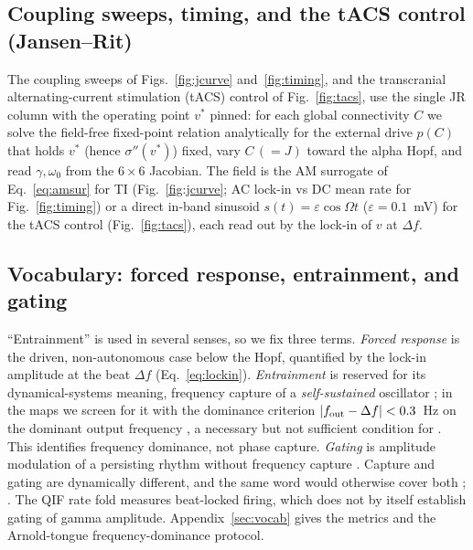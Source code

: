 \documentclass[11pt,a4paper]{article}
\newcommand{\Sig}{\sigma}
\providecommand{\DIFaddtex}[1]{{\protect\color{blue} \sf #1}} %
\providecommand{\DIFdeltex}[1]{{\protect\color{red} \scriptsize #1}} %
\providecommand{\DIFaddbegin}{} %
\providecommand{\DIFaddend}{} %
\providecommand{\DIFdelbegin}{} %
\providecommand{\DIFdelend}{} %
\providecommand{\DIFadd}[1]{\texorpdfstring{\DIFaddtex{#1}}{#1}} %
\providecommand{\DIFdel}[1]{\texorpdfstring{\DIFdeltex{#1}}{}} %
\begin{document}
\subsection{Coupling sweeps, timing, and the tACS control (Jansen--Rit)}
The coupling sweeps of Figs.~\ref{fig:jcurve} and~\ref{fig:timing}, and the transcranial
alternating-current stimulation (tACS) control of Fig.~\ref{fig:tacs}, use the single JR
column with the operating point $v^*$ pinned: for
each global connectivity $C$ we solve the field-free fixed-point relation analytically
for the external drive $p(C)$ that holds $v^*$ (hence $\Sig''(v^*)$) fixed, vary $C\,(=J)$
toward the alpha Hopf, and read $\gamma,\omega_0$ from the $6\times6$ Jacobian. The field
is the AM surrogate of Eq.~\eqref{eq:amsur} for TI (Fig.~\ref{fig:jcurve}; AC lock-in vs DC mean
rate for Fig.~\ref{fig:timing}) or a direct in-band sinusoid $s(t)=\varepsilon\cos\Omega t$
($\varepsilon=0.1$~mV) for the tACS control (Fig.~\ref{fig:tacs}), each read out by the
lock-in of $v$ at $\Delta f$.

\subsection{Vocabulary: forced response, entrainment, and gating}
``Entrainment'' is used in several senses, so we fix three terms. \emph{Forced response}
is the driven, non-autonomous case below the Hopf, quantified by the lock-in amplitude at
the beat $\Delta f$ (Eq.~\eqref{eq:lockin}). \emph{Entrainment} is reserved for its
dynamical-systems meaning, frequency capture of a \emph{self-sustained} oscillator
\cite{pikovsky2001}; in the maps we screen for it with the dominance criterion
$|f_{\rm out}-\Delta f|<0.3$~Hz on the dominant output frequency\DIFdelbegin \DIFdel{, a necessary but not sufficient condition for }\DIFdelend \DIFaddbegin \DIFadd{. This identifies
frequency dominance, not phase }\DIFaddend capture. \emph{Gating} is amplitude modulation of a persisting rhythm without
frequency capture \cite{canolty2010,tort2010}. Capture and gating are dynamically different, and the same word would otherwise cover
both\DIFdelbegin \DIFdel{; }\DIFdelend \DIFaddbegin \DIFadd{. The QIF rate fold measures beat-locked firing, which does not by itself
establish gating of gamma amplitude. }\DIFaddend Appendix~\ref{sec:vocab} gives the metrics
and the \DIFdelbegin \DIFdel{Arnold-tongue }\DIFdelend \DIFaddbegin \DIFadd{frequency-dominance }\DIFaddend protocol.
\end{document}
